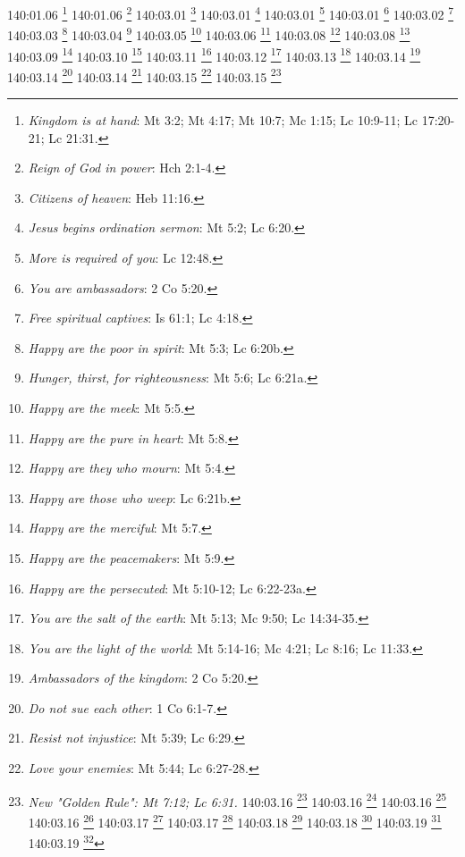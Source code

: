 {{{{{{{{{{{{{{{{{{{{{{{{{{{{{{{{140:01.06 \footnote{\textit{Kingdom is at hand}: Mt 3:2; Mt 4:17; Mt 10:7; Mc 1:15; Lc 10:9-11; Lc 17:20-21; Lc 21:31.}
140:01.06 \footnote{\textit{Reign of God in power}: Hch 2:1-4.}
140:03.01 \footnote{\textit{Citizens of heaven}: Heb 11:16.}
140:03.01 \footnote{\textit{Jesus begins ordination sermon}: Mt 5:2; Lc 6:20.}
140:03.01 \footnote{\textit{More is required of you}: Lc 12:48.}
140:03.01 \footnote{\textit{You are ambassadors}: 2 Co 5:20.}
140:03.02 \footnote{\textit{Free spiritual captives}: Is 61:1; Lc 4:18.}
140:03.03 \footnote{\textit{Happy are the poor in spirit}: Mt 5:3; Lc 6:20b.}
140:03.04 \footnote{\textit{Hunger, thirst, for righteousness}: Mt 5:6; Lc 6:21a.}
140:03.05 \footnote{\textit{Happy are the meek}: Mt 5:5.}
140:03.06 \footnote{\textit{Happy are the pure in heart}: Mt 5:8.}
140:03.08 \footnote{\textit{Happy are they who mourn}: Mt 5:4.}
140:03.08 \footnote{\textit{Happy are those who weep}: Lc 6:21b.}
140:03.09 \footnote{\textit{Happy are the merciful}: Mt 5:7.}
140:03.10 \footnote{\textit{Happy are the peacemakers}: Mt 5:9.}
140:03.11 \footnote{\textit{Happy are the persecuted}: Mt 5:10-12; Lc 6:22-23a.}
140:03.12 \footnote{\textit{You are the salt of the earth}: Mt 5:13; Mc 9:50; Lc 14:34-35.}
140:03.13 \footnote{\textit{You are the light of the world}: Mt 5:14-16; Mc 4:21; Lc 8:16; Lc 11:33.}
140:03.14 \footnote{\textit{Ambassadors of the kingdom}: 2 Co 5:20.}
140:03.14 \footnote{\textit{Do not sue each other}: 1 Co 6:1-7.}
140:03.14 \footnote{\textit{Resist not injustice}: Mt 5:39; Lc 6:29.}
140:03.15 \footnote{\textit{Love your enemies}: Mt 5:44; Lc 6:27-28.}
140:03.15 \footnote{\textit{New "Golden Rule": Mt 7:12; Lc 6:31.}
140:03.16 \footnote{\textit{Be merciful as God is merciful}: Lc 6:36.}
140:03.16 \footnote{\textit{Be you perfect}: Gn 17:1; 1 Re 8:61; Lv 19:2; Dt 18:13; Mt 5:48; 2 Co 13:11; Stg 1:4; 1 P 1:16.}
140:03.16 \footnote{\textit{Father gives sunshine & rain}: Mt 5:45.}
140:03.16 \footnote{\textit{Sons of living God}: 1 Cr 22:10; Sal 2:7; Is 56:5; Mt 5:9,16,45; Lc 20:36; Jn 1:12-13; Jn 11:52; Hch 17:28-29; Ro 8:14-17,19,21; Ro 9:26; 2 Co 6:18; Gl 3:26; Gl 4:5-7; Ef 1:5; Flp 2:15; Heb 12:5-8; 1 Jn 3:1-2,10; 1 Jn 5:2; Ap 21:7; 2 Sam 7:14.}
140:03.17 \footnote{\textit{Mote in other's eye, beam in yours}: Mt 7:3-5; Lc 6:41-42.}
140:03.17 \footnote{\textit{Save men, not judge them}: Mt 7:1-2; Lc 6:37.}
140:03.18 \footnote{\textit{Blind lead blind}: Mt 15:14; Lc 6:39.}
140:03.18 \footnote{\textit{Cast not pearls to swine}: Mt 7:6.}
140:03.19 \footnote{\textit{By their fruits know them}: Mt 7:16-20; Lc 6:43-44.}
140:03.19 \footnote{\textit{Fruit of the spirit}: Gl 5:22-23; Ef 5:9.}
}}}}}}}}}}}}}}}}}}}}}}}}}}}}}}}}}
